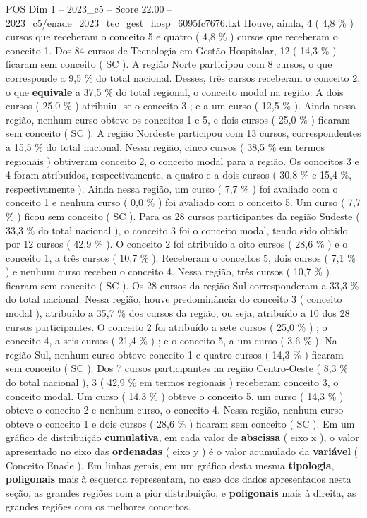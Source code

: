 \begin{textsample}{POS Dim 1 – 2023\_c5 – Score 22.00 – 2023\_c5/enade\_2023\_tec\_gest\_hosp\_6095fc7676.txt}
Houve, ainda, 4 ( 4,8 \% ) cursos que receberam o conceito 5 e quatro ( 4,8 \% ) cursos que receberam o conceito 1.
Dos 84 cursos de Tecnologia em Gestão Hospitalar, 12 ( 14,3 \% ) ficaram sem conceito ( SC ).
A região Norte participou com 8 cursos, o que corresponde a 9,5 \% do total nacional.
Desses, três cursos receberam o conceito 2, o que \textbf{equivale} a 37,5 \% do total regional, o conceito modal na região.
A dois cursos ( 25,0 \% ) atribuiu -se o conceito 3 ; e a um curso ( 12,5 \% ).
Ainda nessa região, nenhum curso obteve os conceitos 1 e 5, e dois cursos ( 25,0 \% ) ficaram sem conceito ( SC ).
A região Nordeste participou com 13 cursos, correspondentes a 15,5 \% do total nacional.
Nessa região, cinco cursos ( 38,5 \% em termos regionais ) obtiveram conceito 2, o conceito modal para a região.
Os conceitos 3 e 4 foram atribuídos, respectivamente, a quatro e a dois cursos ( 30,8 \% e 15,4 \%, respectivamente ).
Ainda nessa região, um curso ( 7,7 \% ) foi avaliado com o conceito 1 e nenhum curso ( 0,0 \% ) foi avaliado com o conceito 5.
Um curso ( 7,7 \% ) ficou sem conceito ( SC ).
Para os 28 cursos participantes da região Sudeste ( 33,3 \% do total nacional ), o conceito 3 foi o conceito modal, tendo sido obtido por 12 cursos ( 42,9 \% ).
O conceito 2 foi atribuído a oito cursos ( 28,6 \% ) e o conceito 1, a três cursos ( 10,7 \% ).
Receberam o conceitos 5, dois cursos ( 7,1 \% ) e nenhum curso recebeu o conceito 4.
Nessa região, três cursos ( 10,7 \% ) ficaram sem conceito ( SC ).
Os 28 cursos da região Sul corresponderam a 33,3 \% do total nacional.
Nessa região, houve predominância do conceito 3 ( conceito modal ), atribuído a 35,7 \% dos cursos da região, ou seja, atribuído a 10 dos 28 cursos participantes.
O conceito 2 foi atribuído a sete cursos ( 25,0 \% ) ; o conceito 4, a seis cursos ( 21,4 \% ) ; e o conceito 5, a um curso ( 3,6 \% ).
Na região Sul, nenhum curso obteve conceito 1 e quatro cursos ( 14,3 \% ) ficaram sem conceito ( SC ).
Dos 7 cursos participantes na região Centro-Oeste ( 8,3 \% do total nacional ), 3 ( 42,9 \% em termos regionais ) receberam conceito 3, o conceito modal.
Um curso ( 14,3 \% ) obteve o conceito 5, um curso ( 14,3 \% ) obteve o conceito 2 e nenhum curso, o conceito 4.
Nessa região, nenhum curso obteve o conceito 1 e dois cursos ( 28,6 \% ) ficaram sem conceito ( SC ).
Em um gráfico de distribuição \textbf{cumulativa}, em cada valor de \textbf{abscissa} ( eixo x ), o valor apresentado no eixo das \textbf{ordenadas} ( eixo y ) é o valor acumulado da \textbf{variável} ( Conceito Enade ).
Em linhas gerais, em um gráfico desta mesma \textbf{tipologia}, \textbf{poligonais} mais à esquerda representam, no caso dos dados apresentados nesta seção, as grandes regiões com a pior distribuição, e \textbf{poligonais} mais à direita, as grandes regiões com os melhores conceitos.

\end{textsample}
